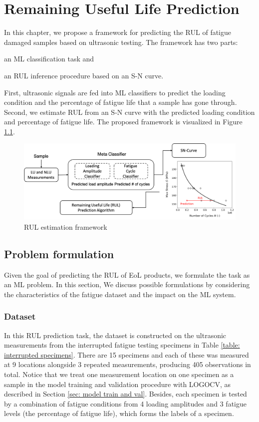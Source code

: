 \chapter{Remaining Useful Life Prediction}
\label{chap: rul}

In this chapter, we propose a framework for predicting the RUL of fatigue damaged samples based on ultrasonic testing. The framework has two parts: \begin{enumerate*}[label=(\alph*)]
    \item an ML classification task and
    \item an RUL inference procedure based on an S-N curve.
\end{enumerate*}  First, ultrasonic signals are fed into ML classifiers to predict the loading condition and the percentage of fatigue life that a sample has gone through. Second, we estimate RUL from an S-N curve with the predicted loading condition and percentage of fatigue life. The proposed framework is visualized in Figure \ref{fig: rul framework}.

\begin{figure}
    \centering
    \includegraphics[width=\linewidth]{fig/rul_framework.png}
    \caption{RUL estimation framework}
    \label{fig: rul framework}
\end{figure}

\section{Problem formulation}
\label{sec: rul prob formulation}
Given the goal of predicting the RUL of EoL products, we formulate the task as an ML problem. In this section, We discuss possible formulations by considering the characteristics of the fatigue dataset and the impact on the ML system.

\subsection{Dataset}
In this RUL prediction task, the dataset is constructed on the ultrasonic measurements from the interrupted fatigue testing specimens in Table \ref{table: interrupted specimens}. There are 15 specimens and each of these was measured at 9 locations alongside 3 repeated measurements, producing 405 observations in total. Notice that we treat one measurement location on one specimen as a sample in the model training and validation procedure with LOGOCV, as described in Section \ref{sec: model train and val}. Besides, each specimen is tested by a combination of fatigue conditions from 4 loading amplitudes and 3 fatigue levels (the percentage of fatigue life), which forms the labels of a specimen.

